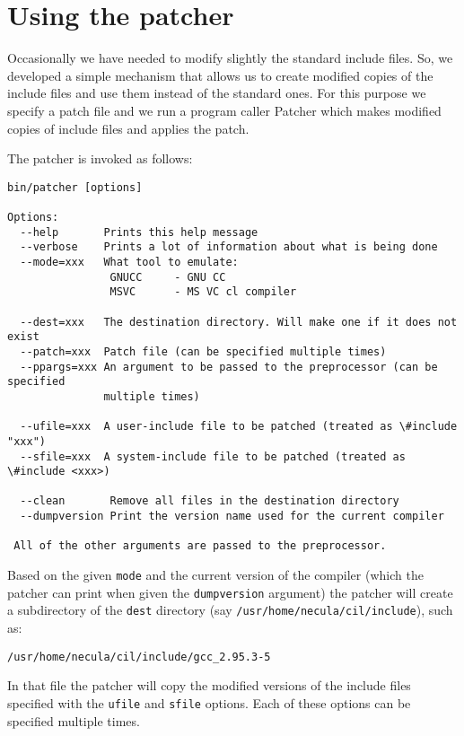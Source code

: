 \documentclass{article}
\def\t#1{{\tt #1}}
\begin{document}
    \section{Using the patcher}\label{sec-patcher}

 Occasionally we have needed to modify slightly the standard include files.
So, we developed a simple mechanism that allows us to create modified copies
of the include files and use them instead of the standard ones. For this
purpose we specify a patch file and we run a program caller Patcher which
makes modified copies of include files and applies the patch.

 The patcher is invoked as follows: 
\begin{verbatim}
bin/patcher [options]

Options:
  --help       Prints this help message
  --verbose    Prints a lot of information about what is being done
  --mode=xxx   What tool to emulate: 
                GNUCC     - GNU CC
                MSVC      - MS VC cl compiler

  --dest=xxx   The destination directory. Will make one if it does not exist
  --patch=xxx  Patch file (can be specified multiple times)
  --ppargs=xxx An argument to be passed to the preprocessor (can be specified
               multiple times)

  --ufile=xxx  A user-include file to be patched (treated as \#include "xxx")
  --sfile=xxx  A system-include file to be patched (treated as \#include <xxx>)
 
  --clean       Remove all files in the destination directory
  --dumpversion Print the version name used for the current compiler

 All of the other arguments are passed to the preprocessor.
\end{verbatim}

 Based on the given \t{mode} and the current version of the compiler (which
the patcher can print when given the \t{dumpversion} argument) the patcher
will create a subdirectory of the \t{dest} directory (say \t{/usr/home/necula/cil/include}), such as:
\begin{verbatim}
/usr/home/necula/cil/include/gcc_2.95.3-5
\end{verbatim}

 In that file the patcher will copy the modified versions of the include files
specified with the \t{ufile} and \t{sfile} options. Each of these options can
be specified multiple times. 
\end{document}
